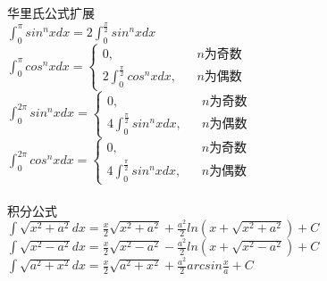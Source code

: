 \documentclass{article}
\begin{document}
\begin{flushleft}
	华里氏公式扩展\\
	$\int_{0}^{\pi}sin^nxdx=2\int_{0}^{\frac{\pi}{2}}sin^nxdx$\\
	$\int_{0}^{\pi}cos^nxdx=\left\{
	\begin{array}{rcl}
	0,& & n\mbox{为奇数}\\
	2\int_{0}^{\frac{\pi}{2}}cos^nxdx,& & n\mbox{为偶数}
	\end{array} \right.$\\
	$\int_{0}^{2\pi}sin^nxdx=\left\{
	\begin{array}{rcl}
	0,& & n\mbox{为奇数}\\
	4\int_{0}^{\frac{\pi}{2}}sin^nxdx,& & n\mbox{为偶数}
	\end{array} \right.$\\
	$\int_{0}^{2\pi}cos^nxdx=\left\{
	\begin{array}{rcl}
	0,& & n\mbox{为奇数}\\
	4\int_{0}^{\frac{\pi}{2}}sin^nxdx,& & n\mbox{为偶数}
	\end{array} \right.$\\
	~\\
	积分公式\\
	$\int \sqrt{x^2+a^2}dx=\frac{x}{2}\sqrt{x^2+a^2}+\frac{a^2}{2}ln(x+\sqrt{x^2+a^2})+C$\\
	$\int \sqrt{x^2-a^2}dx=\frac{x}{2}\sqrt{x^2-a^2}-\frac{a^2}{2}ln(x+\sqrt{x^2-a^2})+C$\\
	$\int \sqrt{a^2+x^2}dx=\frac{x}{2}\sqrt{a^2+x^2}+\frac{a^2}{2}arcsin\frac{x}{a}+C$\\
	
\end{flushleft}
\end{document}

